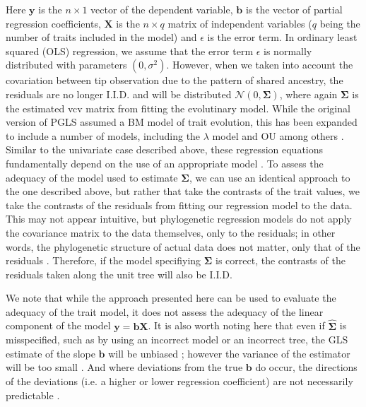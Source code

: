 \documentclass[12pt]{article}
\begin{document}
Here $\mathbf{y}$ is the $n \times 1$ vector of the dependent variable, $\mathbf{b}$ is the vector of partial regression coefficients, $\mathbf{X}$ is the $n \times q$ matrix of independent variables ($q$ being the number of traits included in the model) and $\epsilon$ is the error term. In ordinary least squared (OLS) regression, we assume that the error term $\epsilon$ is normally distributed with parameters $(0, \sigma^2)$. However, when we taken into account the covariation between tip observation due to the pattern of shared ancestry, the residuals are no longer I.I.D. and will be distributed $\mathcal{N} (0, \mathbf{\Sigma})$, where again $\mathbf{\Sigma}$ is the estimated vcv matrix from fitting the evolutinary model. While the original version of PGLS assumed a BM model of trait evolution, this has been expanded to include a number of models, including the $\lambda$ model \citep{Pagel1997, Freckleton2009, Revell2010} and OU \citep{Hansen2008, Labra2009, Bartoszek2012} among others \citep[see also][]{Lynch1991, Hadfield2010}. Similar to the univariate case described above, these regression equations fundamentally depend on the use of an appropriate model \citep{Hansen2012SysBio}. To assess the adequacy of the model used to estimate $\mathbf{\Sigma}$, we can use an identical approach to the one described above, but rather that take the contrasts of the trait values, we take the contrasts of the residuals from fitting our regression model to the data. This may not appear intuitive, but phylogenetic regression models do not apply the covariance matrix to the data themselves, only to the residuals; in other words, the phylogenetic structure of actual data does not matter, only that of the residuals \citep{Rohlf2001}. Therefore, if the model specifiying $\mathbf{\Sigma}$ is correct, the contrasts of the residuals taken along the unit tree will also be I.I.D.

We note that while the approach presented here can be used to evaluate the adequacy of the trait model, it does not assess the adequacy of the linear component of the model $\mathbf{y} = \mathbf{b}\mathbf{X}$. It is also worth noting here that even if $\hat{\mathbf{\Sigma}}$ is misspecified, such as by using an incorrect model or an incorrect tree, the GLS estimate of the slope $\mathbf{b}$ will be unbiased \citep{Rao1999}; however the variance of the estimator will be too small \citep{Rohlf2006}. And where deviations from the true $\mathbf{b}$ do occur, the directions of the deviations (i.e. a higher or lower regression coefficient) are not necessarily predictable \citep{Rohlf2006}. 
\end{document}
